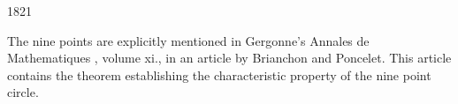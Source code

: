 \documentclass{greaseproof}
\begin{document}

1821

The nine points are explicitly mentioned in Gergonne's Annales de Mathematiques , volume xi., in an article by Brianchon and Poncelet. This article contains the theorem establishing the characteristic property of the nine point circle.
\end{document}
